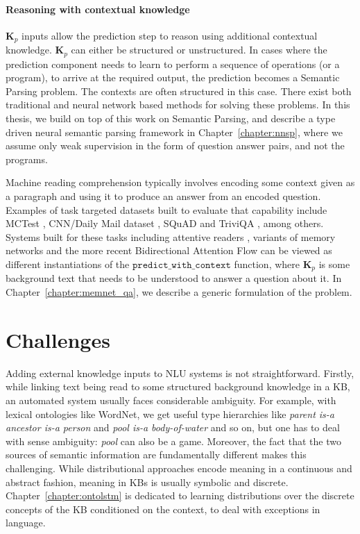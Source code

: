 \paragraph{Reasoning with contextual knowledge}
$\textbf{K}_p$ inputs allow the prediction step to reason using additional contextual knowledge. $\textbf{K}_p$ can either be structured or unstructured. In cases where the prediction component
needs to learn to perform a sequence of operations (or a program), to arrive at the required output, the prediction becomes a Semantic Parsing problem.
The contexts are often structured in this case. There exist both traditional \citep[among others]{Zelle1996LearningTP,Zettlemoyer2005LearningTM,zettlemoyer2007online} and neural network based methods
\citep{Dong2016LanguageTL,Andreas2016LearningTC,Liang2016NeuralSM,Neelakantan2016LearningAN} for solving these problems. 
In this thesis, we build on top of this work on Semantic Parsing, and describe a type driven neural semantic 
parsing framework in Chapter~\ref{chapter:nnsp}, where we assume only weak supervision in the form of question answer pairs, and not the programs.

Machine reading comprehension typically involves encoding some context given as a paragraph and using it to
produce an answer from an encoded question. Examples of task targeted datasets built to evaluate that capability include MCTest \citep{Richardson2013MCTestAC},
CNN/Daily Mail dataset \citep{hermann2015teaching}, SQuAD \citep{Rajpurkar2016SQuAD10} and TriviQA \citep{Joshi2017TriviaQAAL}, among others.
Systems built for these tasks including attentive readers \citep{hermann2015teaching}, variants of memory networks \citep{weston2014memory,Sukhbaatar2015EndToEndMN,Xiong2016DynamicMN}
and the more recent Bidirectional Attention Flow \citep{Seo2016BidirectionalAF} can be viewed as different instantiations
of the $\mathtt{predict\_with\_context}$ function, where $\textbf{K}_p$ is some background text that needs to be understood to answer a question about it. 
In Chapter~\ref{chapter:memnet_qa}, we describe a generic formulation of the problem.

\section{Challenges}

Adding external knowledge inputs to NLU systems is not straightforward.  Firstly, while linking text being read to some structured background knowledge
in a KB, an automated system usually faces considerable ambiguity. For example, with lexical ontologies like WordNet, 
we get useful type hierarchies like \textit{parent is-a ancestor is-a person} and \textit{pool is-a body-of-water} 
and so on, but one has to deal with sense ambiguity: \textit{pool} can also be a game. Moreover, the fact that the two sources of semantic information are fundamentally different 
makes this challenging. While distributional approaches encode meaning in a
continuous and abstract fashion, meaning in KBs is usually symbolic and discrete. Chapter~\ref{chapter:ontolstm} is dedicated to learning 
distributions over the discrete concepts of the KB conditioned on the context, to deal with exceptions in language.

